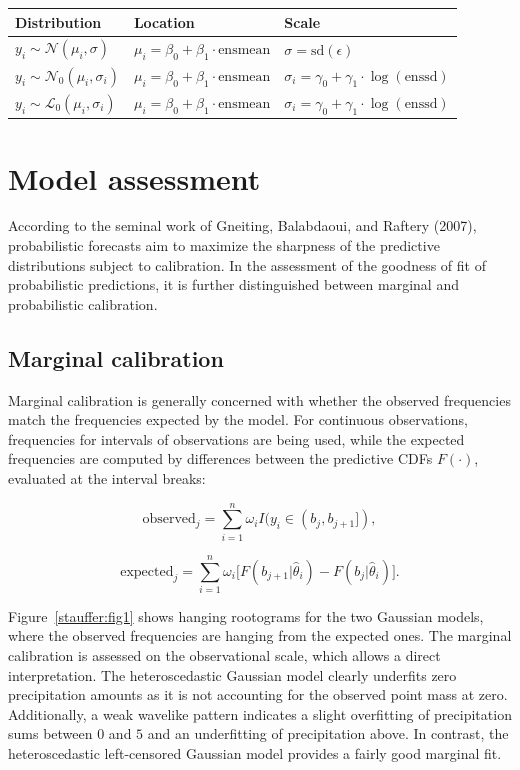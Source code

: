 \documentclass[twoside]{report}
\begin{document}
\begin{table}[!ht]\centering
    \begin{tabular}{lll}
         Distribution                              & Location                                         & Scale \\
        \midrule[0.09 em]
        $y_i \sim \mathcal{N}(\mu_i, \sigma)$     & $\mu_i = \beta_0 + \beta_1 \cdot \text{ensmean}$ & $\sigma = \text{sd}(\epsilon)$ \\
        $y_i \sim \mathcal{N}_0(\mu_i, \sigma_i)$ & $\mu_i = \beta_0 + \beta_1 \cdot \text{ensmean}$ & $\sigma_i = \gamma_0 + \gamma_1 \cdot \log(\text{enssd})$ \\
        $y_i \sim \mathcal{L}_0(\mu_i, \sigma_i)$ & $\mu_i = \beta_0 + \beta_1 \cdot \text{ensmean}$ & $\sigma_i = \gamma_0 + \gamma_1 \cdot \log(\text{enssd})$ \\
        \bottomrule[0.09 em]
    \end{tabular}
\end{table}


\section{Model assessment}

According to the seminal work of Gneiting, Balabdaoui, and Raftery (2007),
probabilistic forecasts aim to maximize the sharpness of the predictive
distributions subject to calibration. 
In the assessment of the goodness of fit of probabilistic predictions,
it is further distinguished between marginal and probabilistic calibration.

\subsection{Marginal calibration}

Marginal calibration is generally concerned with whether the observed
frequencies match the frequencies expected by the model.  For continuous
observations, frequencies for intervals of observations are being used, while
the expected frequencies are computed by differences between the predictive
CDFs $F(\cdot)$, evaluated at the interval breaks:

$$
\text{observed}_j = \sum_{i=1}^n \omega_i I(y_i \in (b_j, b_{j+1}]),
$$

$$
\text{expected}_j = \sum_{i=1}^n \omega_i \big[ F(b_{j+1} | \hat{\theta}_i) - F(b_{j} | \hat{\theta}_i) \big].
$$

Figure~\ref{stauffer:fig1} shows hanging rootograms for the two Gaussian
models, where the observed frequencies are hanging from the expected ones. The
marginal calibration is assessed on the observational scale, which allows a
direct interpretation.  The heteroscedastic Gaussian model clearly underfits
zero precipitation amounts as it is not accounting for the observed point mass
at zero. Additionally, a weak wavelike pattern indicates a slight overfitting
of precipitation sums between $0$ and $5$ and an underfitting of precipitation
above. In contrast, the heteroscedastic left-censored Gaussian model provides a
fairly good marginal fit.
\end{document}
